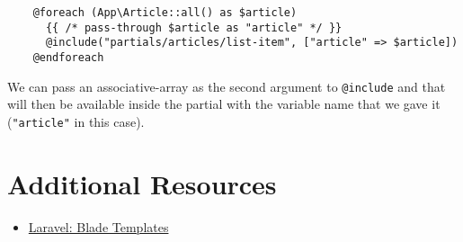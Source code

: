 \begin{verbatim}
    @foreach (App\Article::all() as $article)
      {{ /* pass-through $article as "article" */ }}
      @include("partials/articles/list-item", ["article" => $article])
    @endforeach
\end{verbatim}

We can pass an associative-array as the second argument to \texttt{@include} and that will then be available inside the partial with the variable name that we gave it (\texttt{"article"} in this case).

\section{Additional Resources}

\begin{itemize}[leftmargin=*]
    \item \href{http://laravel.com/docs/master/blade}{Laravel: Blade Templates}
\end{itemize}

